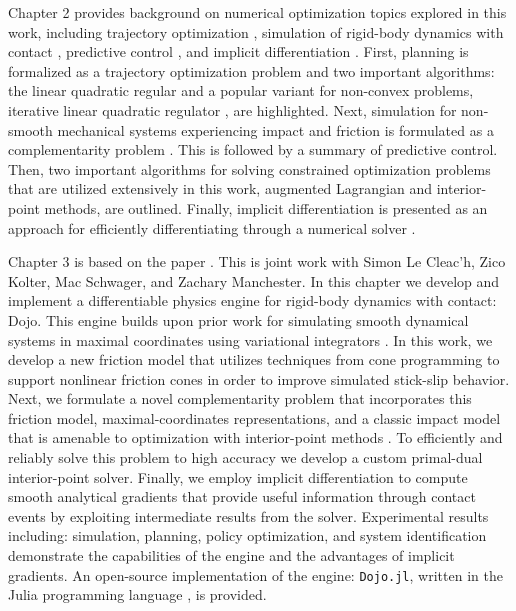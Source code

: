 Chapter 2 provides background on numerical optimization \cite{nocedal2006numerical} topics explored in this work, including trajectory optimization \cite{betts1998survey}, simulation of rigid-body dynamics with contact \cite{marsden2001discrete}, predictive control \cite{mayne2014model}, and implicit differentiation \cite{dini1907lezioni}. First, planning is formalized as a trajectory optimization problem and two important algorithms: the linear quadratic regular \cite{kalman1964lqr} and a popular variant for non-convex problems, iterative linear quadratic regulator \cite{mayne1966second}, are highlighted. Next, simulation for non-smooth mechanical systems experiencing impact and friction is formulated as a complementarity problem \cite{stewart1996implicit}. This is followed by a summary of predictive control. Then, two important algorithms for solving constrained optimization problems that are utilized extensively in this work, augmented Lagrangian \cite{bertsekas2014constrained} and interior-point \cite{nesterov1994interior} methods, are outlined. Finally, implicit differentiation is presented as an approach for efficiently differentiating through a numerical solver \cite{amos2017optnet, agrawal2019differentiating}.

Chapter 3 is based on the paper \cite{howell2022dojo}. This is joint work with Simon Le Cleac'h, Zico Kolter, Mac Schwager, and Zachary Manchester. In this chapter we develop and implement a differentiable physics engine for rigid-body dynamics with contact: Dojo. This engine builds upon prior work for simulating smooth dynamical systems in maximal coordinates using variational integrators \cite{brudigam2020linear}. In this work, we develop a new friction model that utilizes techniques from cone programming \cite{boyd2004convex} to support nonlinear friction cones in order to improve simulated stick-slip behavior. Next, we formulate a novel complementarity problem \cite{cottle2009linear} that incorporates this friction model, maximal-coordinates representations, and a classic impact model that is amenable to optimization with interior-point methods \cite{nesterov1994interior}. To efficiently and reliably solve this problem to high accuracy we develop a custom primal-dual interior-point solver. Finally, we employ implicit differentiation \cite{dini1907lezioni} to compute smooth analytical gradients that provide useful information through contact events by exploiting intermediate results from the solver. Experimental results including: simulation, planning, policy optimization, and system identification demonstrate the capabilities of the engine and the advantages of implicit gradients. An open-source implementation of the engine: \texttt{Dojo.jl}, written in the Julia programming language \cite{Julia-2017}, is provided.

